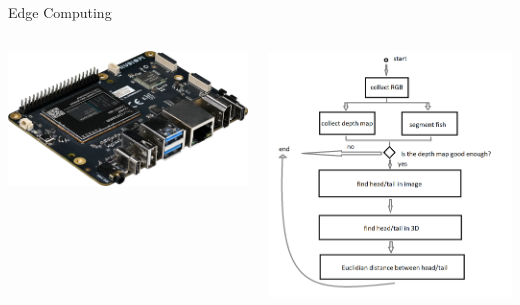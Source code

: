 \begin{frame}{Edge Computing}
    \begin{columns}
        \centering
        \includegraphics[width=\linewidth]{images/rubik-pi-3-1.png}
        
        \centering
        \includegraphics[width=\linewidth]{images/dwe-diagram.png}
    \end{columns}
\end{frame}

